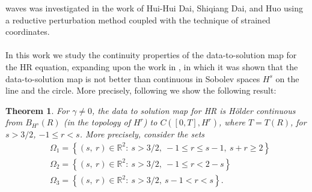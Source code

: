 \documentclass[12pt,reqno]{amsart}
\numberwithin{equation}{section}  %
\numberwithin{figure}{section}
\newcommand{\rr}{\mathbb{R}}
\newtheorem{theorem}{Theorem}
\begin{document}
waves was investigated in the work of Hui-Hui Dai, 
Shiqiang Dai, and Huo \cite{Dai_2000_Head-on-collisi} using a reductive 
perturbation method coupled with the technique of strained coordinates. 
\\
\\
In this work we study the continuity properties of the data-to-solution map for
the HR 
equation, expanding upon the work in \cite{Karapetyan:2010fk}, in which it was
shown that the data-to-solution map is not better than continuous in Sobolev
spaces $H^{s}$ on the line
and the circle. More precisely, following \cite{Chen:2011fk} we show the
following result:
%
%
\begin{theorem}
For $\gamma \neq 0$, the
data to solution map for HR is H\"older continuous from $B_{H^{s}}(R)$ (in
the topology of $H^{r}$) to $C([0, T], H^{r})$, where $T = T(R)$, for $s >
3/2$, $-1 \le r < s$. More
precisely, consider the sets
  \begin{equation*}
  \begin{split}
      & \Omega_{1} = \left\{ (s, \ r) \in \rr^{2}:
     \ s>3/2, \ -1 \le r \le s-1, \ s + r \ge 2  \right\}
    \\
    & \Omega_{2} = \left\{  (s, \ r) \in \rr^{2}:
     \ s>3/2, \ -1 \le r < 2-s \right\}
    \\
    & \Omega_{3} = \left\{ (s, \ r) \in \rr^{2}:
    \  s>3/2, \  s-1 < r < s  \right\}.
    \end{split}
\end{equation*}
\label{thm:main-thm}
\end{theorem}
%
\begin{center}
\end{center}
\end{document}
